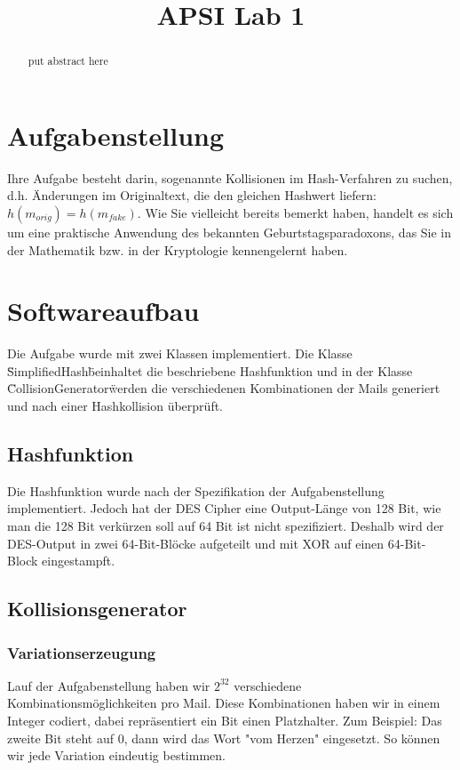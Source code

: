 \documentclass[12pt]{scrartcl}
\title{ %
APSI Lab 1
\vspace{0.2cm}
}
\begin{document}
 \maketitle
 \thispagestyle{firststyle}
 \pagestyle{firststyle}
 \begin{abstract}
 \begin{center}
  put abstract here  
 \end{center}
 \vspace{0.5cm}
\hrulefill
\end{abstract}

 \pagestyle{documentstyle}
 \tableofcontents
 \pagebreak
\section{Aufgabenstellung}
Ihre Aufgabe besteht darin, sogenannte Kollisionen im Hash-Verfahren zu suchen, d.h. Änderungen
im Originaltext, die den gleichen Hashwert liefern: $ h(m_{orig}) = h(m_{fake})$. Wie Sie vielleicht
bereits bemerkt haben, handelt es sich um eine praktische Anwendung des bekannten
Geburtstagsparadoxons, das Sie in der Mathematik bzw. in der Kryptologie kennengelernt
haben.

\section{Softwareaufbau}
Die Aufgabe wurde mit zwei Klassen implementiert. Die Klasse \"SimplifiedHash\" beinhaltet die beschriebene Hashfunktion und in der Klasse \"CollisionGenerator\" werden die verschiedenen Kombinationen der Mails generiert und nach einer Hashkollision überprüft.

\subsection{Hashfunktion}
Die Hashfunktion wurde nach der Spezifikation der Aufgabenstellung implementiert. Jedoch hat der DES Cipher eine Output-Länge von  128 Bit, wie man die 128 Bit verkürzen soll auf 64 Bit ist nicht spezifiziert. Deshalb wird der DES-Output in zwei 64-Bit-Blöcke aufgeteilt und mit XOR auf einen 64-Bit-Block eingestampft.

\subsection{Kollisionsgenerator}
\subsubsection{Variationserzeugung}
Lauf der Aufgabenstellung haben wir $2^{32}$ verschiedene Kombinationsmöglichkeiten pro Mail. Diese Kombinationen haben wir in einem Integer codiert, dabei repräsentiert ein Bit einen Platzhalter.   Zum Beispiel: Das zweite Bit steht auf 0, dann wird das Wort "vom Herzen" eingesetzt. So können wir jede Variation eindeutig bestimmen.
\end{document}
